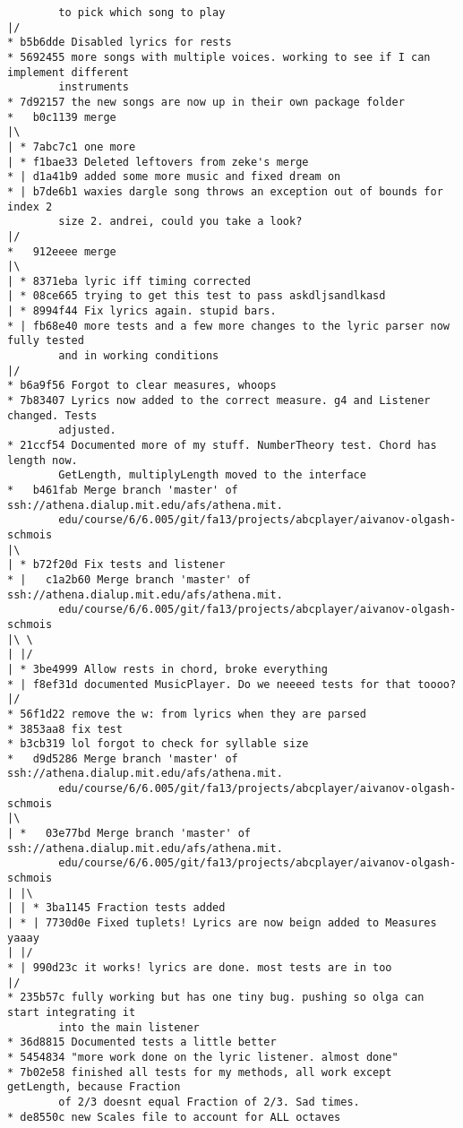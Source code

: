 \documentclass[12pt]{book}
\begin{document}
\begin{Verbatim}
        to pick which song to play
|/
* b5b6dde Disabled lyrics for rests
* 5692455 more songs with multiple voices. working to see if I can implement different 
        instruments
* 7d92157 the new songs are now up in their own package folder
*   b0c1139 merge
|\
| * 7abc7c1 one more
| * f1bae33 Deleted leftovers from zeke's merge
* | d1a41b9 added some more music and fixed dream on
* | b7de6b1 waxies dargle song throws an exception out of bounds for index 2 
        size 2. andrei, could you take a look?
|/
*   912eeee merge
|\
| * 8371eba lyric iff timing corrected
| * 08ce665 trying to get this test to pass askdljsandlkasd
| * 8994f44 Fix lyrics again. stupid bars.
* | fb68e40 more tests and a few more changes to the lyric parser now fully tested 
        and in working conditions
|/
* b6a9f56 Forgot to clear measures, whoops
* 7b83407 Lyrics now added to the correct measure. g4 and Listener changed. Tests 
        adjusted.
* 21ccf54 Documented more of my stuff. NumberTheory test. Chord has length now. 
        GetLength, multiplyLength moved to the interface
*   b461fab Merge branch 'master' of ssh://athena.dialup.mit.edu/afs/athena.mit.
        edu/course/6/6.005/git/fa13/projects/abcplayer/aivanov-olgash-schmois
|\
| * b72f20d Fix tests and listener
* |   c1a2b60 Merge branch 'master' of ssh://athena.dialup.mit.edu/afs/athena.mit.
        edu/course/6/6.005/git/fa13/projects/abcplayer/aivanov-olgash-schmois
|\ \
| |/
| * 3be4999 Allow rests in chord, broke everything
* | f8ef31d documented MusicPlayer. Do we neeeed tests for that toooo?
|/
* 56f1d22 remove the w: from lyrics when they are parsed
* 3853aa8 fix test
* b3cb319 lol forgot to check for syllable size
*   d9d5286 Merge branch 'master' of ssh://athena.dialup.mit.edu/afs/athena.mit.
        edu/course/6/6.005/git/fa13/projects/abcplayer/aivanov-olgash-schmois
|\
| *   03e77bd Merge branch 'master' of ssh://athena.dialup.mit.edu/afs/athena.mit.
        edu/course/6/6.005/git/fa13/projects/abcplayer/aivanov-olgash-schmois
| |\
| | * 3ba1145 Fraction tests added
| * | 7730d0e Fixed tuplets! Lyrics are now beign added to Measures yaaay
| |/
* | 990d23c it works! lyrics are done. most tests are in too
|/
* 235b57c fully working but has one tiny bug. pushing so olga can start integrating it 
        into the main listener
* 36d8815 Documented tests a little better
* 5454834 "more work done on the lyric listener. almost done"
* 7b02e58 finished all tests for my methods, all work except getLength, because Fraction 
        of 2/3 doesnt equal Fraction of 2/3. Sad times.
* de8550c new Scales file to account for ALL octaves

\end{Verbatim}
\end{document}
